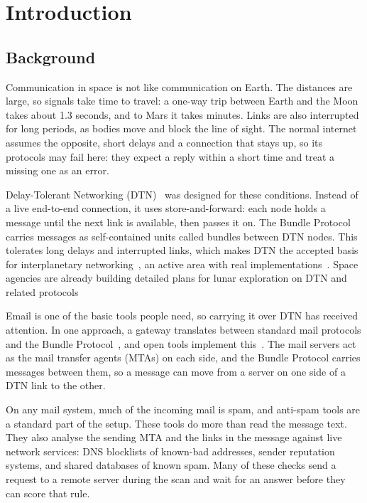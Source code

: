 \chapter{Introduction}

\section{Background}

Communication in space is not like communication on Earth. The distances are large,
so signals take time to travel: a one-way trip between Earth and the Moon takes
about 1.3 seconds, and to Mars it takes minutes. Links are also interrupted for long periods, as bodies move and block the line of sight. The normal internet assumes the opposite, short delays and a connection that stays up, so its protocols may fail here: they expect a reply within a short time and treat a missing one as an error.

Delay-Tolerant Networking (DTN)~\cite{rfc4838} was designed for these conditions.
Instead of a live end-to-end connection, it uses store-and-forward: each node holds
a message until the next link is available, then passes it on. The Bundle Protocol~\cite{rfc9171} carries messages as self-contained units called bundles between DTN nodes. This tolerates long delays and interrupted links, which makes DTN the accepted basis for interplanetary networking~\cite{kaneko-ssi}, an active area with real implementations~\cite{ion, velazco-smallsats}. Space agencies are already building detailed plans for lunar exploration on DTN and related protocols ~\cite{cosby-lunar}

Email is one of the basic tools people need, so carrying it over DTN has received
attention. In one approach, a gateway translates between standard mail protocols and the Bundle Protocol~\cite{johnson-dtn-interplanetary-smtp-01, blanchet-dtn-email-over-bp-06}, and open tools implement this~\cite{bpmail}. The mail servers act as the mail transfer agents (MTAs) on each side, and the Bundle Protocol carries messages between them, so a message can move from a server on one side of a DTN link to the other.

On any mail system, much of the incoming mail is spam, and anti-spam tools are a
standard part of the setup. These tools do more than read the message text. They also analyse the sending MTA and the links in the message against live network services: DNS blocklists of known-bad addresses, sender reputation systems, and shared databases of known spam. Many of these checks send a request to a remote server during the scan and wait for an answer before they can score that rule.

